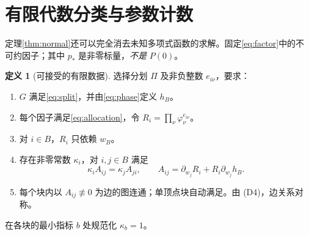 \documentclass[UTF8,11pt,a4paper,fontset=fandol]{ctexart}
\theoremstyle{definition}\newtheorem{definition}[theorem]{定义}
\theoremstyle{remark}\newtheorem{remark}[theorem]{注}
\begin{document}
\section{有限代数分类与参数计数}\label{sec:finite}
定理\ref{thm:normal}还可以完全消去未知多项式函数的求解。固定\eqref{eq:factor}中的不可约因子；其中 $p_*$ 是非零标量，\emph{不是} $P(0)$。

\begin{definition}[可接受的有限数据]\label{def:data}
选择分划 $\Pi$ 及非负整数 $e_{i\nu}$，要求：
\begin{enumerate}[label=(D\arabic*)]
\item $G$ 满足\eqref{eq:split}，并由\eqref{eq:phase}定义 $h_B$。
\item 每个因子满足\eqref{eq:allocation}，令 $R_i=\prod_\nu\varphi_\nu^{e_{i\nu}}$。
\item 对 $i\in B$，$R_i$ 只依赖 $w_B$。
\item 存在非零常数 $\kappa_i$，对 $i,j\in B$ 满足
\begin{equation}\label{eq:kappa}
\kappa_i A_{ij}=\kappa_j A_{ji},\qquad
A_{ij}=\partial_{w_j}R_i+R_i\partial_{w_j}h_B.
\end{equation}
\item 每个块内以 $A_{ij}\not\equiv0$ 为边的图连通；单顶点块自动满足。由 (D4)，边关系对称。
\end{enumerate}
在各块的最小指标 $b$ 处规范化 $\kappa_b=1$。
\end{definition}
\end{document}
